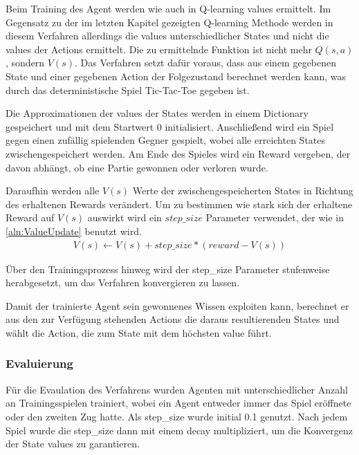 \documentclass[11pt]{scrartcl}
\begin{document}
Beim Training des Agent werden wie auch in Q-learning values ermittelt. Im Gegensatz zu
der im letzten Kapitel gezeigten Q-learning Methode werden in diesem Verfahren allerdings 
die values unterschiedlicher States und nicht die values der Actions ermittelt. Die zu
ermittelnde Funktion ist nicht mehr $Q(s, a)$, sondern $V(s)$. Das Verfahren setzt dafür
voraus, dass aus einem gegebenen State und einer gegebenen Action der Folgezustand berechnet
werden kann, was durch das deterministische Spiel Tic-Tac-Toe gegeben ist.

Die Approximationen der values der States werden in einem Dictionary gespeichert und mit
dem Startwert 0 initialisiert. Anschließend wird ein Spiel gegen einen zufällig spielenden
Gegner gespielt, wobei alle erreichten States zwischengespeichert werden. Am Ende des
Spieles wird ein Reward vergeben, der davon abhängt, ob eine Partie gewonnen oder verloren
wurde.

Daraufhin werden alle $V(s)$ Werte der zwischengespeicherten States in Richtung des
erhaltenen Rewards verändert. Um zu bestimmen wie stark sich der erhaltene Reward auf
$V(s)$ auswirkt wird ein $step\_size$ Parameter verwendet, der wie in 
\autoref{aln:ValueUpdate} benutzt wird.
\begin{align}
  V(s) \leftarrow V(s) + step\_size * (reward - V(s))
  \label{aln:ValueUpdate}
\end{align}
\noindent

Über den Trainingsprozess hinweg wird der step\_size Parameter stufenweise herabgesetzt,
um das Verfahren konvergieren zu lassen.

Damit der trainierte Agent sein gewonnenes Wissen exploiten kann, berechnet er aus den
zur Verfügung stehenden Actions die daraus resultierenden States und wählt die Action, die
zum State mit dem höchsten value führt.

\subsubsection{Evaluierung}
Für die Evaulation des Verfahrens wurden Agenten mit unterschiedlicher Anzahl an
Trainingsspielen trainiert, wobei ein Agent entweder immer das Spiel eröffnete oder
den zweiten Zug hatte. Als step\_size wurde initial 0.1 genutzt. Nach jedem Spiel wurde
die step\_size dann mit einem decay multipliziert, um die Konvergenz der State values
zu garantieren.
\end{document}
